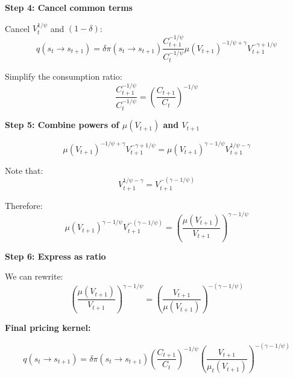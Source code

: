 \documentclass{beamer}
\begin{document}
\begin{frame}[allowframebreaks]
    \framebreak
    
    \textbf{Step 4: Cancel common terms}
    
    Cancel $V_t^{1/\psi}$ and $(1-\delta)$:
    \begin{equation*}
        q(s_t \to s_{t+1}) = \delta \pi(s_t \to s_{t+1}) \frac{C_{t+1}^{-1/\psi}}{C_t^{-1/\psi}} \mu(V_{t+1})^{-1/\psi + \gamma} V_{t+1}^{-\gamma + 1/\psi}
    \end{equation*}
    
    Simplify the consumption ratio:
    \begin{equation*}
        \frac{C_{t+1}^{-1/\psi}}{C_t^{-1/\psi}} = \left( \frac{C_{t+1}}{C_t} \right)^{-1/\psi}
    \end{equation*}
    
    \framebreak
    
    \textbf{Step 5: Combine powers of $\mu(V_{t+1})$ and $V_{t+1}$}
    
    \begin{equation*}
        \mu(V_{t+1})^{-1/\psi + \gamma} V_{t+1}^{-\gamma + 1/\psi} = \mu(V_{t+1})^{\gamma - 1/\psi} V_{t+1}^{1/\psi - \gamma}
    \end{equation*}
    
    Note that:
    \begin{equation*}
        V_{t+1}^{1/\psi - \gamma} = V_{t+1}^{-(\gamma - 1/\psi)}
    \end{equation*}
    
    Therefore:
    \begin{equation*}
        \mu(V_{t+1})^{\gamma - 1/\psi} V_{t+1}^{-(\gamma - 1/\psi)} = \left( \frac{\mu(V_{t+1})}{V_{t+1}} \right)^{\gamma - 1/\psi}
    \end{equation*}
    
    \framebreak
    
    \textbf{Step 6: Express as ratio}
    
    We can rewrite:
    \begin{equation*}
        \left( \frac{\mu(V_{t+1})}{V_{t+1}} \right)^{\gamma - 1/\psi} = \left( \frac{V_{t+1}}{\mu(V_{t+1})} \right)^{-(\gamma - 1/\psi)}
    \end{equation*}
    
    \framebreak
    
    \textbf{Final pricing kernel:}
    \begin{tcolorbox}[colback=green!5!white, colframe=green!75!black, title=Pricing Kernel]
    \begin{equation*}
        q(s_t \to s_{t+1}) = \delta \pi(s_t \to s_{t+1}) \left( \frac{C_{t+1}}{C_t} \right)^{-1/\psi} \left( \frac{V_{t+1}}{\mu_t(V_{t+1})} \right)^{-(\gamma - 1/\psi)}
    \end{equation*}
    \end{tcolorbox}
\end{frame}
\end{document}
